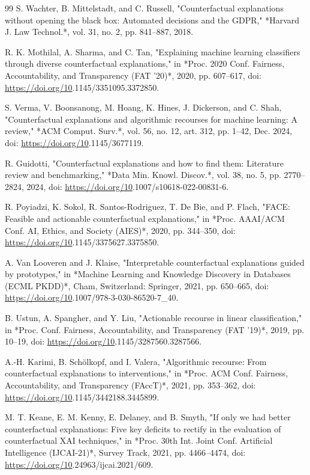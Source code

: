 \begin{thebibliography}{99}
 S. Wachter, B. Mittelstadt, and C. Russell, "Counterfactual explanations without opening the black box: Automated decisions and the GDPR," *Harvard J. Law Technol.*, vol. 31, no. 2, pp. 841–887, 2018.

 R. K. Mothilal, A. Sharma, and C. Tan, "Explaining machine learning classifiers through diverse counterfactual explanations," in *Proc. 2020 Conf. Fairness, Accountability, and Transparency (FAT\* '20)*, 2020, pp. 607–617, doi: \url{https://doi.org/10}.1145/3351095.3372850.

 S. Verma, V. Boonsanong, M. Hoang, K. Hines, J. Dickerson, and C. Shah, "Counterfactual explanations and algorithmic recourses for machine learning: A review," *ACM Comput. Surv.*, vol. 56, no. 12, art. 312, pp. 1–42, Dec. 2024, doi: \url{https://doi.org/10}.1145/3677119.

 R. Guidotti, "Counterfactual explanations and how to find them: Literature review and benchmarking," *Data Min. Knowl. Discov.*, vol. 38, no. 5, pp. 2770–2824, 2024, doi: \url{https://doi.org/10}.1007/s10618-022-00831-6.

 R. Poyiadzi, K. Sokol, R. Santos-Rodriguez, T. De Bie, and P. Flach, "FACE: Feasible and actionable counterfactual explanations," in *Proc. AAAI/ACM Conf. AI, Ethics, and Society (AIES)*, 2020, pp. 344–350, doi: \url{https://doi.org/10}.1145/3375627.3375850.

 A. Van Looveren and J. Klaise, "Interpretable counterfactual explanations guided by prototypes," in *Machine Learning and Knowledge Discovery in Databases (ECML PKDD)*, Cham, Switzerland: Springer, 2021, pp. 650–665, doi: \url{https://doi.org/10}.1007/978-3-030-86520-7\_40.

 B. Ustun, A. Spangher, and Y. Liu, "Actionable recourse in linear classification," in *Proc. Conf. Fairness, Accountability, and Transparency (FAT\* '19)*, 2019, pp. 10–19, doi: \url{https://doi.org/10}.1145/3287560.3287566.

 A.-H. Karimi, B. Schölkopf, and I. Valera, "Algorithmic recourse: From counterfactual explanations to interventions," in *Proc. ACM Conf. Fairness, Accountability, and Transparency (FAccT)*, 2021, pp. 353–362, doi: \url{https://doi.org/10}.1145/3442188.3445899.

 M. T. Keane, E. M. Kenny, E. Delaney, and B. Smyth, "If only we had better counterfactual explanations: Five key deficits to rectify in the evaluation of counterfactual XAI techniques," in *Proc. 30th Int. Joint Conf. Artificial Intelligence (IJCAI-21)*, Survey Track, 2021, pp. 4466–4474, doi: \url{https://doi.org/10}.24963/ijcai.2021/609.


\end{thebibliography}
